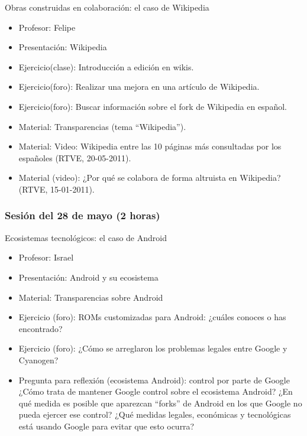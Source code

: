\documentclass[a4paper,12pt]{article}
\begin{document}
Obras construidas en colaboración: el caso de Wikipedia


\begin{itemize}
\item Profesor: Felipe
\item Presentación: Wikipedia
\item Ejercicio(clase): Introducción a edición en wikis.
\item Ejercicio(foro): Realizar una mejora en una artículo de Wikipedia.
\item Ejercicio(foro): Buscar información sobre el fork de Wikipedia en español.
\item Material: Transparencias (tema ``Wikipedia'').
\item Material: Video: Wikipedia entre las 10 páginas más consultadas por los 
españoles (RTVE, 20-05-2011).
\item Material (video): ¿Por qué se colabora de forma altruista en Wikipedia? 
(RTVE, 15-01-2011).
\end{itemize}

\subsubsection{Sesión del 28 de mayo (2 horas)}

Ecosistemas tecnológicos: el caso de Android


\begin{itemize}
\item Profesor: Israel
\item Presentación: Android y su ecosistema
\item Material: Transparencias sobre Android
\item Ejercicio (foro): ROMs customizadas para Android: ¿cuáles
  conoces o has encontrado?
\item Ejercicio (foro): ¿Cómo se arreglaron los problemas legales
  entre Google y Cyanogen?
\item Pregunta para reflexión (ecosistema Android): control por parte de Google \\
  ¿Cómo trata de mantener Google control sobre el ecosistema Android? ¿En qué medida es posible que aparezcan ``forks'' de Android en los que Google no pueda ejercer ese control? ¿Qué medidas legales, económicas y tecnológicas está usando Google para evitar que esto ocurra?
\end{itemize}
\end{document}
